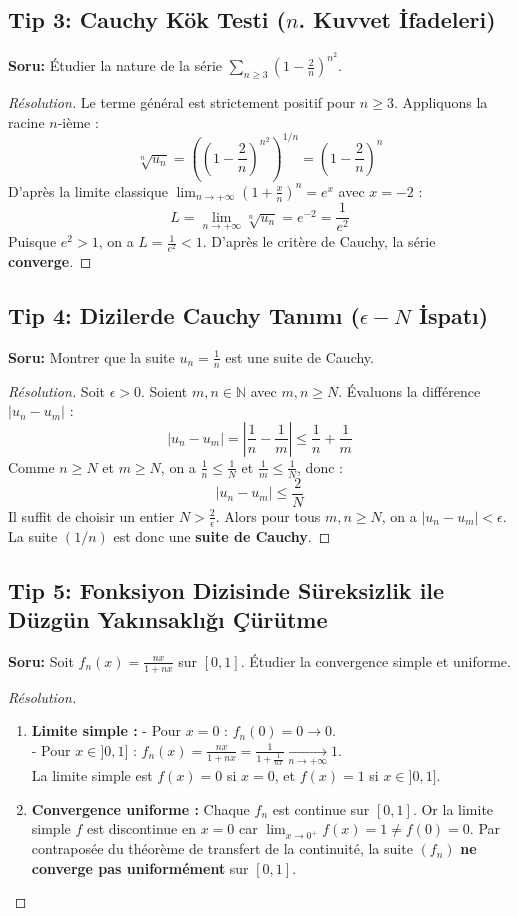 \documentclass[11pt,a4paper]{article}
\begin{document}
\subsection*{Tip 3: Cauchy Kök Testi ($n$. Kuvvet İfadeleri)}
\textbf{Soru:} Étudier la nature de la série $\sum_{n \ge 3} \left(1 - \frac{2}{n}\right)^{n^2}$.
\begin{proof}[Résolution]
Le terme général est strictement positif pour $n \ge 3$. Appliquons la racine $n$-ième :
\[ \sqrt[n]{u_n} = \left( \left(1 - \frac{2}{n}\right)^{n^2} \right)^{1/n} = \left(1 - \frac{2}{n}\right)^n \]
D'après la limite classique $\lim_{n \to +\infty} \left(1 + \frac{x}{n}\right)^n = e^x$ avec $x = -2$ :
\[ L = \lim_{n \to +\infty} \sqrt[n]{u_n} = e^{-2} = \frac{1}{e^2} \]
Puisque $e^2 > 1$, on a $L = \frac{1}{e^2} < 1$. D'après le critère de Cauchy, la série \textbf{converge}.
\end{proof}

\subsection*{Tip 4: Dizilerde Cauchy Tanımı ($\epsilon - N$ İspatı)}
\textbf{Soru:} Montrer que la suite $u_n = \frac{1}{n}$ est une suite de Cauchy.
\begin{proof}[Résolution]
Soit $\epsilon > 0$. Soient $m, n \in \mathbb{N}$ avec $m, n \ge N$. Évaluons la différence $|u_n - u_m|$ :
\[ |u_n - u_m| = \left| \frac{1}{n} - \frac{1}{m} \right| \le \frac{1}{n} + \frac{1}{m} \]
Comme $n \ge N$ et $m \ge N$, on a $\frac{1}{n} \le \frac{1}{N}$ et $\frac{1}{m} \le \frac{1}{N}$, donc :
\[ |u_n - u_m| \le \frac{2}{N} \]
Il suffit de choisir un entier $N > \frac{2}{\epsilon}$. Alors pour tous $m, n \ge N$, on a $|u_n - u_m| < \epsilon$.
La suite $(1/n)$ est donc une \textbf{suite de Cauchy}.
\end{proof}

\newpage

\subsection*{Tip 5: Fonksiyon Dizisinde Süreksizlik ile Düzgün Yakınsaklığı Çürütme}
\textbf{Soru:} Soit $f_n(x) = \frac{nx}{1+nx}$ sur $[0, 1]$. Étudier la convergence simple et uniforme.
\begin{proof}[Résolution]
\begin{enumerate}
    \item \textbf{Limite simple :} 
    - Pour $x = 0$ : $f_n(0) = 0 \to 0$.\\
    - Pour $x \in ]0, 1]$ : $f_n(x) = \frac{nx}{1+nx} = \frac{1}{1 + \frac{1}{nx}} \xrightarrow[n \to +\infty]{} 1$.\\
    La limite simple est $f(x) = 0$ si $x=0$, et $f(x)=1$ si $x \in ]0, 1]$.
    \item \textbf{Convergence uniforme :}
    Chaque $f_n$ est continue sur $[0, 1]$. Or la limite simple $f$ est discontinue en $x=0$ car $\lim_{x \to 0^+} f(x) = 1 \neq f(0) = 0$.
    Par contraposée du théorème de transfert de la continuité, la suite $(f_n)$ \textbf{ne converge pas uniformément} sur $[0, 1]$.
\end{enumerate}
\end{proof}
\end{document}
